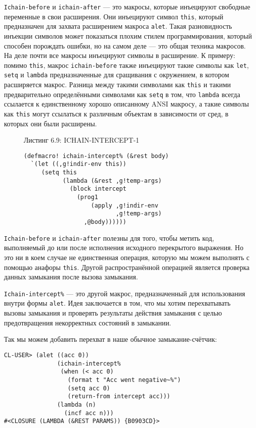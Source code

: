 \verb"Ichain-before" и \verb"ichain-after" --- это макросы, которые инъецируют свободные переменные в свои расширения. Они инъецируют символ \verb"this", который предназначен для захвата расширением макроса \verb"alet". Такая разновидность инъекции символов может показаться плохим стилем программирования, который способен порождать ошибки, но на самом деле --- это общая техника макросов. На деле почти все макросы инъецируют символы в расширение. К примеру: помимо \verb"this", макрос \verb"ichain-before" также инъецируют такие символы как \verb"let", \verb"setq" и \verb"lambda" предназначенные для сращивания с окружением, в котором расширяется макрос. Разница между такими символами как \verb"this" и такими предварительно определёнными символами как \verb"setq" в том, что \verb"lambda" всегда ссылается к единственному хорошо описанному ANSI макросу, а такие символы как \verb"this" могут ссылаться к различным объектам в зависимости от сред, в которых они были расширены.

\begin{figure}Листинг 6.9: ICHAIN-INTERCEPT-1\label{listing_6.9}
\listbegin
\begin{verbatim}
(defmacro! ichain-intercept% (&rest body)
  `(let ((,g!indir-env this))
     (setq this
           (lambda (&rest ,g!temp-args)
             (block intercept
               (prog1
                   (apply ,g!indir-env
                          ,g!temp-args)
                 ,@body))))))
\end{verbatim}
\listend
\end{figure}

\verb"Ichain-before" и \verb"ichain-after" полезны для того, чтобы метить код, выполняемый до или после исполнения исходного перекрытого выражения. Но это ни в коем случае не единственная операция, которую мы можем выполнять с помощью анафоры \verb"this". Другой распространённой операцией является проверка данных замыкания после вызова замыкания.

\verb"Ichain-intercept%" --- это другой макрос, предназначенный для использования внутри формы \verb"alet". Идея заключается в том, что мы хотим перехватывать вызовы замыкания и проверять результаты действия замыкания с целью предотвращения некорректных состояний в замыкании.

Так мы можем добавить перехват в наше обычное замыкание-счётчик:

\begin{verbatim}
CL-USER> (alet ((acc 0))
               (ichain-intercept%
                (when (< acc 0)
                  (format t "Acc went negative~%")
                  (setq acc 0)
                  (return-from intercept acc)))
               (lambda (n)
                 (incf acc n)))
#<CLOSURE (LAMBDA (&REST PARAMS)) {B0903CD}>
\end{verbatim}

